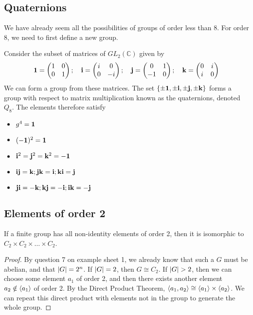 \subsection{Quaternions}
We have already seem all the possibilities of groups of order less than 8.
For order 8, we need to first define a new group.
\begin{definition}
	Consider the subset of matrices of \(GL_2(\mathbb C)\) given by
	\[
		\vb 1 = \begin{pmatrix}
			1 & 0 \\ 0 & 1
		\end{pmatrix};\quad \vb i = \begin{pmatrix}
			i & 0 \\ 0 & -i
		\end{pmatrix};\quad \vb j = \begin{pmatrix}
			0 & 1 \\ -1 & 0
		\end{pmatrix};\quad \vb k = \begin{pmatrix}
			0 & i \\ i & 0
		\end{pmatrix}
	\]
	We can form a group from these matrices.
	The set \(\{ \pm \vb 1, \pm \vb i, \pm \vb j, \pm \vb k \}\) forms a group with respect to matrix multiplication known as the quaternions, denoted \(Q_8\).
	The elements therefore satisfy
	\begin{itemize}
		\item \(g^4 = \vb 1\)
		\item \((-\vb 1)^2 = \vb 1\)
		\item \(\vb i^2 = \vb j^2 = \vb k^2 = -\vb 1\)
		\item \(\vb i \vb j = \vb k; \vb j \vb k = \vb i; \vb k \vb i = \vb j\)
		\item \(\vb j \vb i = -\vb k; \vb k \vb j = -\vb i; \vb i \vb k = -\vb j\)
	\end{itemize}
\end{definition}

\subsection{Elements of order 2}
\begin{lemma}
	If a finite group has all non-identity elements of order 2, then it is isomorphic to \(C_2 \times C_2 \times \dots \times C_2\).
\end{lemma}
\begin{proof}
	By question 7 on example sheet 1, we already know that such a \(G\) must be abelian, and that \(\abs{G} = 2^n\).
	If \(\abs{G} = 2\), then \(G \cong C_2\).
	If \(\abs{G} > 2\), then we can choose some element \(a_1\) of order 2, and then there exists another element \(a_2 \notin \langle{} a_1 \rangle\) of order 2.
	By the Direct Product Theorem, \(\langle{} a_1, a_2 \rangle \cong \langle{} a_1 \rangle \times \langle{} a_2 \rangle\).
	We can repeat this direct product with elements not in the group to generate the whole group.
\end{proof}

